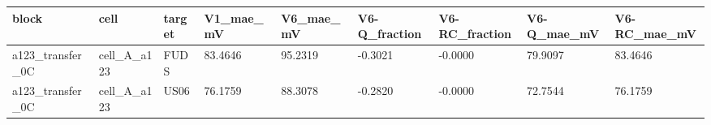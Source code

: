\begin{tabular}{lllllllll}
\hline
block & cell & target & V1\_mae\_mV & V6\_mae\_mV & V6-Q\_fraction & V6-RC\_fraction & V6-Q\_mae\_mV & V6-RC\_mae\_mV \\
\hline
a123\_transfer\_0C & cell\_A\_a123 & FUDS & 83.4646 & 95.2319 & -0.3021 & -0.0000 & 79.9097 & 83.4646 \\
a123\_transfer\_0C & cell\_A\_a123 & US06 & 76.1759 & 88.3078 & -0.2820 & -0.0000 & 72.7544 & 76.1759 \\
\hline
\end{tabular}
